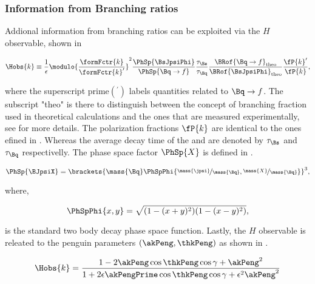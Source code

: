 \subsubsection{Information from Branching ratios}
Addional information from branching ratios can be exploited via the $H$ observable, shown in 

\begin{equation}
\centering
  \Hobs{k} \equiv   \frac{1}{\epsilon}
            \modulo{\frac{\formFctr{k}}{\formFctr{k}'}}^2
                    \frac{\PhSp{\BsJpsiPhi}} {\PhSp{\Bq\to f}}
                    \frac{\tau_{\Bs}}{\tau_{\Bq}}
                    \frac{\BRof{\Bq\to f}_{\rm theo}}{\BRof{\BsJpsiPhi}_{\rm theo}}
                    \frac{\fP{k}'}{{\fP{k}}},
\label{hobs_def}
\end{equation}

\noindent where the superscript prime$({}^\prime)$ labels quantities related to $\Bq\to f$. The subscript "theo" is there to distinguish
between the concept of branching fraction used in theoretical calculations and the ones that are measured experimentally,
see  for more details. The polarization fractions $\fP{k}$ are identical to the ones
efined in . Whereas the average decay time of the \Bs and \Bq are denoted by $\tau_{\Bs}$ and $\tau_{\Bq}$
respectivelly. The phase space factor $\PhSp{X}$ is defined in .

\begin{equation}
\centering
   \PhSp{\BJpsiX}  = \brackets{ \mass{\Bq} \PhSpPhi{ \nicefrac{\mass{\jpsi}}{\mass{\Bq}}, \nicefrac{\mass{X}}{\mass{\Bq}}  } }^3,
\label{phase_space_eq_def}
\end{equation}

\noindent where,

\begin{equation}
\centering
   \PhSpPhi{x,y} = \sqrt{ (1-(x+y)^2)(1-(x-y)^2) },
\label{phase_space_phi_eq_def}
\end{equation}

\noindent is the standard two body decay phase space function. Lastly, the $H$ observable is releated to the penguin parameters
$(\akPeng,\thkPeng)$ as shown in .

\begin{equation}
\centering
  \Hobs{k} = \frac{1-2\akPeng\cos\thkPeng\cos\gamma + \akPeng^2}{1+2\epsilon\akPengPrime\cos\thkPeng\cos\gamma + \epsilon^2\akPeng^2}
\label{Hobs_peng_param}
\end{equation}

